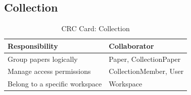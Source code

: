 \subsection{Collection}

\begin{table}[H]
    \centering
    \small
    \begin{tabularx}{\textwidth}{|l|X|} %
        \hline %
        \textbf{Responsibility}        & \textbf{Collaborator}  \\
        \hline %
        Group papers logically         & Paper, CollectionPaper \\
        \hline %
        Manage access permissions      & CollectionMember, User \\
        \hline %
        Belong to a specific workspace & Workspace              \\
        \hline %
    \end{tabularx}
    \caption{CRC Card: Collection}\label{tab:srs-crc-collection}
\end{table}
